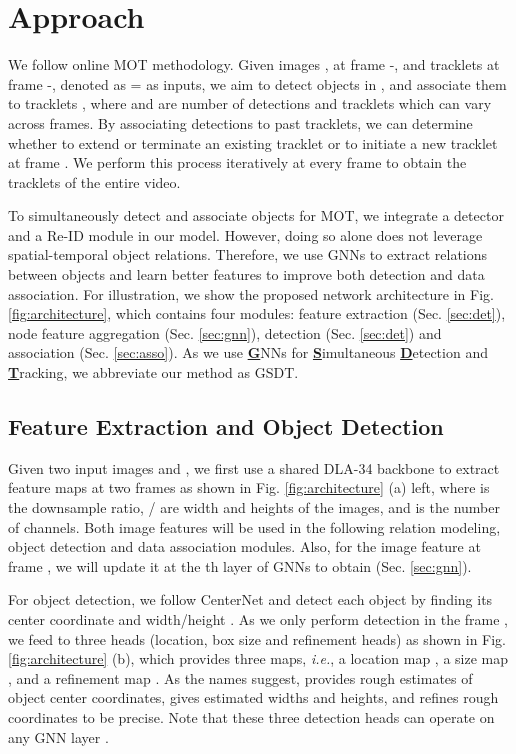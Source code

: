 \documentclass[letterpaper, 10 pt, conference]{ieeeconf}
\begin{document}
\section{Approach}

We follow online MOT methodology. Given images ,  at frame -,  and tracklets at frame -, denoted as = as inputs, we aim to detect objects  in , and associate them to tracklets , where  and  are number of detections and tracklets which can vary across frames. By associating detections to past tracklets, we can determine whether to extend or terminate an existing tracklet or to initiate a new tracklet at frame . We perform this process iteratively at every frame to obtain the tracklets of the entire video.

To simultaneously detect and associate objects for MOT, we integrate a detector and a Re-ID module in our model. However, doing so alone does not leverage spatial-temporal object relations. Therefore, we use GNNs to extract relations between objects and learn better features to improve both detection and data association. For illustration, we show the proposed network architecture in Fig. \ref{fig:architecture}, which contains four modules: feature extraction (Sec. \ref{sec:det}), node feature aggregation (Sec. \ref{sec:gnn}), detection (Sec. \ref{sec:det}) and association (Sec. \ref{sec:asso}). As we use \underline{\textbf{G}}NNs for \underline{\textbf{S}}imultaneous \underline{\textbf{D}}etection and \underline{\textbf{T}}racking, we abbreviate our method as GSDT.

\subsection{Feature Extraction and Object Detection \label{sec:det}}
Given two input images  and , we first use a shared DLA-34 backbone \cite{yu2019deep} to extract feature maps at two frames  as shown in Fig. \ref{fig:architecture} (a) left, where  is the downsample ratio, / are width and heights of the images, and  is the number of channels. Both image features  will be used in the following relation modeling, object detection and data association modules. Also, for the image feature at frame , we will update it at the th layer of GNNs to obtain  (Sec. \ref{sec:gnn}).

For object detection, we follow CenterNet \cite{centerNet} and detect each object by finding its center coordinate  and width/height . As we only perform detection in the frame , we feed  to three heads (location, box size and refinement heads) as shown in Fig. \ref{fig:architecture} (b), which provides three maps, \emph{i.e.}, a location map , a size map , and a refinement map . As the names suggest,  provides rough estimates of object center coordinates,  gives estimated widths and heights, and  refines rough coordinates to be precise. Note that these three detection heads can operate on any GNN layer .
\end{document}
